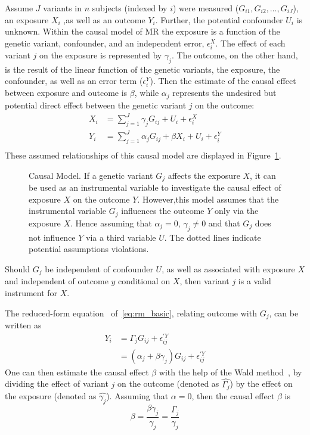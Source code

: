Assume $J$ variants in $n$ subjects (indexed by $i$) were measured ($G_{i1}, G_{i2}, \ldots , G_{iJ}$),
an exposure $X_i$ ,as well as an outcome $Y_i$.
Further, the potential confounder $U_i$ is unknown. 
Within the causal model of MR the exposure is a function of the genetic variant, confounder, and an independent error, $\epsilon_i^X$. 
The effect of each variant $j$ on the exposure is represented by $\gamma_j$.
The outcome, on the other hand, is the result of the linear function of the genetic variants, the exposure, the confounder, as well as an error term ($\epsilon_i^Y$).
Then the estimate of the causal effect between exposure and outcome is $\beta$, while $\alpha_j$ represents the undesired but potential direct effect between the genetic variant $j$ on the outcome:
\begin{equation} \label{eq:rm_basic}
  \begin{split}
    X_i &= \sum^J_{j=1} \gamma_jG_{ij} + U_i + \epsilon_i^X \\
    Y_i &= \sum^J_{j=1} \alpha_jG_{ij} + \beta X_i + U_i + \epsilon_i^Y \\
  \end{split}
\end{equation}
These assumed relationships of this causal model are displayed in Figure~\ref{fig:causal}.
\begin{figure}[!h]
  \centering
  \resizebox{0.5\textwidth}{!}{}
  \caption[Causal Model]{Causal Model.
    If a genetic variant $G_j$ affects the exposure $X$, it can be used as an instrumental variable to investigate the causal effect of exposure $X$ on the outcome $Y$.
    However,this model assumes that the instrumental variable $G_j$ influences the outcome $Y$ only via the exposure $X$.
    Hence assuming that $\alpha_j=0$, $\gamma_j\neq0$ and that $G_j$ does not influence $Y$ via a third variable $U$. 
    The dotted lines indicate potential assumptions violations.
  }\label{fig:causal}
\end{figure}
Should $G_j$ be independent of confounder $U$,
as well as associated with exposure $X$ and independent of outcome $y$ conditional on $X$, then variant $j$ is a valid instrument for $X$.

The reduced-form equation~\cite{Bowden2015} of~\ref{eq:rm_basic}, relating outcome with $G_j$, can be written as
\begin{equation}
	\begin{split}
		Y_i &= \Gamma_j G_{ij} + \epsilon_{ij}^{'Y} \\
		&= (\alpha_j + \beta\gamma_j)G_{ij} + \epsilon_{ij}^{'Y}
	\end{split}
\end{equation}
One can then estimate the causal effect $\beta$ with the help of the Wald method~\cite{Wald1940},
by dividing the effect of variant $j$ on the outcome (denoted as $\hat{\Gamma_j}$) by the effect on the exposure (denoted as $\hat{\gamma_j}$).
Assuming that $\alpha=0$, then the causal effect $\beta$ is
\begin{equation} \label{eq:causal_estiamte}
	\beta = \frac{\beta\gamma_j}{\gamma_j}= \frac{\Gamma_j}{\gamma_j}
\end{equation}

